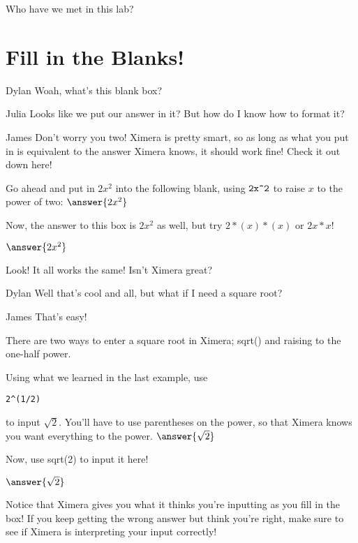 \documentclass{ximera}
\begin{document}
\begin{question}
Who have we met in this lab?
\begin{selectAll}
\end{selectAll}
\end{question}

\section{Fill in the Blanks!}
\begin{dialogue}
\item[Dylan] Woah, what's this blank box?
\item[Julia] Looks like we put our answer in it? But how do I know how to format it?
\item[James] Don't worry you two! Ximera is pretty smart, so as long as what you put in is equivalent to the answer Ximera knows, it should work fine! Check it out down here!
\end{dialogue}

\begin{question}
Go ahead and put in $2x^2$ into the following blank, using
$\verb|2x^2|$
to raise $x$ to the power of two:
$\answer{2x^2}$
\end{question}
\begin{question}
Now, the answer to this box is $2x^2$ as well, but try $2*(x)*(x)$ or $2x*x$!

$\answer{2x^2}$
\begin{feedback}[correct]
Look! It all works the same! Isn't Ximera great?
\end{feedback}
\end{question}

\begin{dialogue}
\item[Dylan] Well that's cool and all, but what if I need a square root?
\item[James] That's easy!
\end{dialogue}

There are two ways to enter a square root in Ximera; sqrt() and raising to the one-half power.

\begin{question}
Using what we learned in the last example, use
\begin{verbatim}
2^(1/2)
\end{verbatim}
to input $\sqrt{2}$. You'll have to use parentheses on the power, so that Ximera knows you want everything to the power.
$\answer{\sqrt{2}}$
\end{question}
\begin{question}
Now, use sqrt(2) to input it here!

$\answer{\sqrt{2}}$
\begin{feedback}[correct]
Notice that Ximera gives you what it thinks you're inputting as you fill in the box! If you keep getting the wrong answer but think you're right, make sure to see if Ximera is interpreting your input correctly!
\end{feedback}
\end{question}
\end{document}
